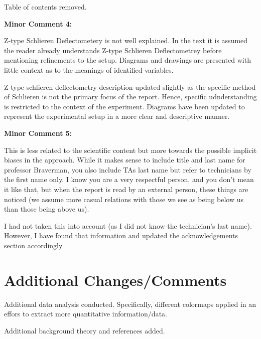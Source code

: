 \documentclass[%
 aip,
cp,  %
 amsmath,amssymb,
 reprint,%
]{revtex4-2}
\begin{document}
        {\color{red}
        
        Table of contents removed.

        }
        \begin{mdframed} \textbf{Minor Comment 4:}

            Z-type Schlieren Deflectometery is not well explained. In the text it is assumed the reader already understands Z-type Schlieren Deflectometrey before mentioning refinements to the setup. Diagrams and drawings are presented with little context as to the meanings of identified variables.

        \end{mdframed}  
        {\color{red}
        
        Z-type schlieren deflectometry description updated slightly as the specific method of Schlieren is not the primary focus of the report. Hence, specific udnderstanding is restricted to the context of the experiment. Diagrams have been updated to represent the experimental setup in a more clear and descriptive manner.

        }
        \begin{mdframed} \textbf{Minor Comment 5:}

            This is less related to the scientific content but more towards the possible implicit biases in the approach. While it makes sense to include title and last name for professor Braverman, you also include TAs last name but refer to technicians by the first name only. I know you are a very respectful person, and you don't mean it like that, but when the report is read by an external person, these things are noticed (we assume more casual relations with those we see as being below us than those being above us).
        \end{mdframed}  
        {\color{red}
        
        I had not taken this into account (as I did not know the technician's last name). However, I have found that information and updated the acknowledgements section accordingly

        }

\newpage
\section{Additional Changes/Comments}
    {\color{red}
            
    Additional data analysis conducted. Specifically, different colormaps applied in an effors to extract more quantitative information/data.

    Additional background theory and references added.

    }
\newpage

\end{document}
